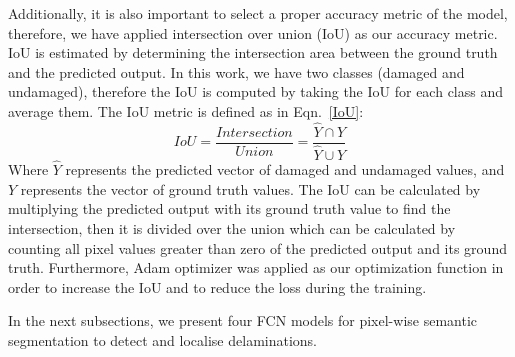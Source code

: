 Additionally, it is also important to select a proper accuracy metric of the model, therefore, we have applied intersection over union (IoU) as our accuracy metric. 
IoU is estimated by determining the intersection area between the ground truth and the predicted output.
In this work, we have two classes (damaged and undamaged), therefore the IoU is computed by taking the IoU for each class and average them.
The IoU metric is defined as in Eqn.~\ref{IoU}:
\begin{equation}
IoU = \frac{Intersection}{Union} = \frac{\hat{Y} \cap Y}{\hat{Y} \cup Y} 
\label{IoU}
\end{equation}
Where \(\hat{Y}\) represents the predicted vector of damaged and undamaged values, and \(Y\) represents the vector of ground truth values.
The IoU can be calculated by multiplying the predicted output with its ground truth value to find the intersection, then it is divided over the union which can be calculated by counting all pixel values greater than zero of the predicted output and its ground truth.
Furthermore, Adam optimizer was applied as our optimization function in order to increase the IoU and to reduce the loss during the training.

In the next subsections, we present four FCN models for pixel-wise semantic segmentation to detect and localise delaminations.
